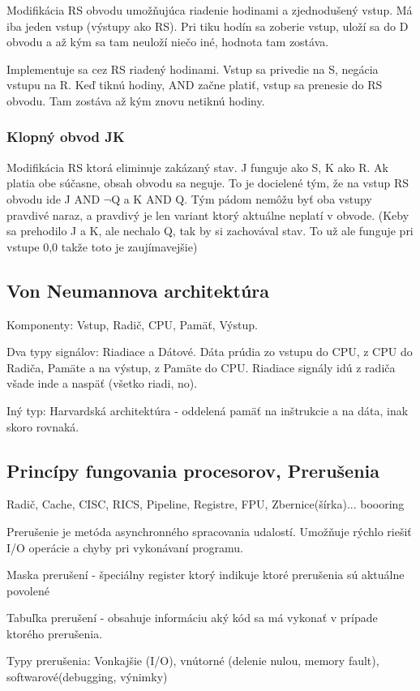 \documentclass[a4paper,10pt]{article}
\begin{document}
\begin{multicols}{2}
			Modifikácia RS obvodu umožňujúca riadenie hodinami a zjednodušený vstup. Má iba jeden vstup (výstupy ako RS). Pri tiku hodín sa zoberie vstup, uloží sa do D obvodu a až kým sa tam neuloží niečo iné, hodnota tam zostáva.
			
			Implementuje sa cez RS riadený hodinami. Vstup sa privedie na S, negácia vstupu na R. Keď tiknú hodiny, AND začne platiť, vstup sa prenesie do RS obvodu. Tam zostáva až kým znovu netiknú hodiny.
		
		\subsubsection{Klopný obvod JK}
		
			Modifikácia RS ktorá eliminuje zakázaný stav. J funguje ako S, K ako R. Ak platia obe súčasne, obsah obvodu sa neguje. To je docielené tým, že na vstup RS obvodu ide J AND $\neg$Q a K AND Q. Tým pádom nemôžu byť oba vstupy pravdivé naraz, a pravdivý je len variant ktorý aktuálne neplatí v obvode. (Keby sa prehodilo J a K, ale nechalo Q, tak by si zachovával stav. To už ale funguje pri vstupe 0,0 takže toto je zaujímavejšie)
			
	\subsection{Von Neumannova architektúra}
	
		Komponenty: Vstup, Radič, CPU, Pamäť, Výstup.
		
		Dva typy signálov: Riadiace a Dátové. Dáta prúdia zo vstupu do CPU, z CPU do Radiča, Pamäte a na výstup, z Pamäte do CPU. Riadiace signály idú z radiča všade inde a naspäť (všetko riadi, no).
		
		Iný typ: Harvardská architektúra - oddelená pamäť na inštrukcie a na dáta, inak skoro rovnaká.
		
	\subsection{Princípy fungovania procesorov, Prerušenia}
	
		Radič, Cache, CISC, RICS, Pipeline, Registre, FPU, Zbernice(šírka)... boooring
		
		Prerušenie je metóda asynchronného spracovania udalostí. Umožňuje rýchlo riešiť I/O operácie a chyby pri vykonávaní programu. 
		
		Maska prerušení - špeciálny register ktorý indikuje ktoré prerušenia sú aktuálne povolené
		
		Tabuľka prerušení - obsahuje informáciu aký kód sa má vykonať v prípade ktorého prerušenia.
		
		Typy prerušenia: Vonkajšie (I/O), vnútorné (delenie nulou, memory fault), softwarové(debugging, výnimky)
	
\end{multicols}
\end{document}
